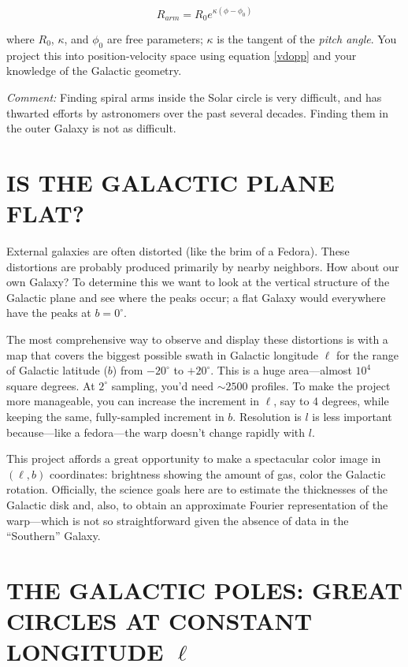 \documentclass[psfig,preprint]{aastex}
\begin{document}
\begin{enumerate}
\begin{equation}
R_{arm}  =  R_0 e^ {\kappa (\phi - \phi_0)} 
\end{equation}

\noindent where $R_0$, $\kappa$, and $\phi_0$ are free parameters;
$\kappa$ is the tangent of the {\it pitch angle}.  You project this into
position-velocity space using equation \ref{vdopp} and your knowledge of
the Galactic geometry.  

{\it Comment:} Finding spiral arms inside the Solar circle is very
difficult, and has thwarted efforts by astronomers over the past several
decades. Finding them in the outer Galaxy is not as difficult.

\end{enumerate}

\section{IS THE GALACTIC PLANE FLAT?}

External galaxies are often distorted (like the brim of a Fedora). 
These distortions are probably produced primarily by nearby neighbors. 
How about our own Galaxy? To determine this we want to look at the
vertical structure of the Galactic plane and see where the peaks occur;
a flat Galaxy would everywhere have the peaks at $b=0^\circ$. 

The most comprehensive way to observe and display these distortions is
with a map that covers the biggest possible swath in Galactic longitude
$\ell$ for the range of Galactic latitude ($b$) from $-20^\circ$ to
$+20^\circ$. This is a huge area---almost $10^4$ square degrees. At
$2^\circ$ sampling, you'd need $\sim 2500$ profiles.  To make the
project more manageable, you can increase the increment in $\ell$, say
to 4 degrees, while keeping the same, fully-sampled increment in
$b$. Resolution is $l$ is less important because---like a
fedora---the warp doesn't change rapidly with $l$.

This project affords a great opportunity to make a spectacular color
image in $(\ell,b)$ coordinates: brightness showing the amount of gas,
color the Galactic rotation.  Officially, the science goals here are to
estimate the thicknesses of the Galactic disk and, also, to obtain an
approximate Fourier representation of the warp---which is not so
straightforward given the absence of data in the ``Southern'' Galaxy.

\section{THE GALACTIC POLES: GREAT CIRCLES AT CONSTANT LONGITUDE $\ell$}
\label{galacticpoles}
\end{document}

